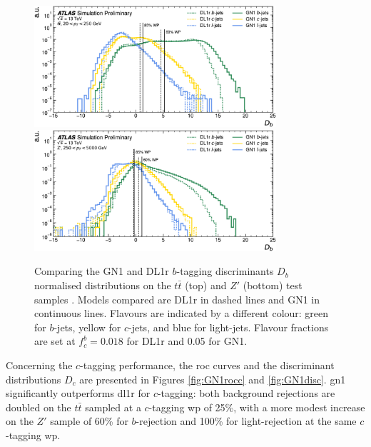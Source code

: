 \newpage
\begin{figure}[h!]
  \centering
  \includegraphics[width=0.8\textwidth]{Images/FTAG/GN/GN1/eff/ttb.png}
  \includegraphics[width=0.8\textwidth]{Images/FTAG/GN/GN1/eff/zpb.png}
  \caption{Comparing the GN1 and DL1r $b$-tagging discriminants $D_b$ normalised distributions on the $t\bar{t}$ (top) and $Z'$ (bottom) test samples \cite{ATL-PHYS-PUB-2022-027}. Models compared are DL1r in dashed lines and GN1 in continuous lines. Flavours are indicated by a different colour: green for $b$-jets, yellow for $c$-jets, and blue for light-jets. Flavour fractions are set at $f^b_c = 0.018$ for DL1r and 0.05 for GN1.}
  \label{fig:GN1disb}
\end{figure} 

Concerning the $c$-tagging performance, the \gls{roc} curves and the discriminant distributions $D_c$ are presented in Figures \ref{fig:GN1rocc} and \ref{fig:GN1disc}. \gls{gn1} significantly outperforms \gls{dl1r} for $c$-tagging: both background rejections are doubled on the $t\bar{t}$ sampled at a $c$-tagging \gls{wp} of 25\%, with a more modest increase on the $Z'$ sample of 60\% for $b$-rejection and 100\% for light-rejection at the same $c$-tagging \gls{wp}. \\

